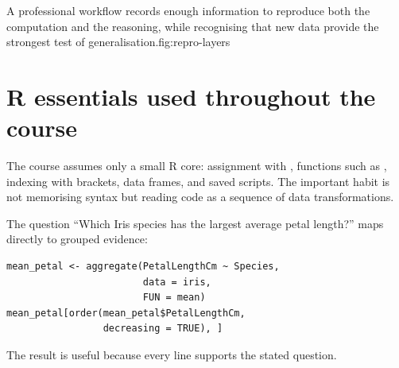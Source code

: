 \begin{utpfig}{A professional workflow records enough information to reproduce both the computation and the reasoning, while recognising that new data provide the strongest test of generalisation.}{fig:repro-layers}
\end{utpfig}

\section{R essentials used throughout the course}
The course assumes only a small R core: assignment with \rcode{<-}, functions such as , indexing with brackets, data frames, and saved scripts. The important habit is not memorising syntax but reading code as a sequence of data transformations.

\begin{workedexample}
The question ``Which Iris species has the largest average petal length?'' maps directly to grouped evidence:
\begin{lstlisting}[style=dsr]
mean_petal <- aggregate(PetalLengthCm ~ Species,
                        data = iris,
                        FUN = mean)
mean_petal[order(mean_petal$PetalLengthCm,
                 decreasing = TRUE), ]
\end{lstlisting}
The result is useful because every line supports the stated question.
\end{workedexample}


